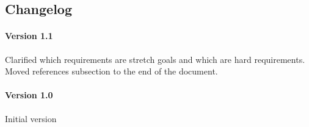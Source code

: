 \subsection{ Changelog }

\paragraph*{Version 1.1} Clarified which requirements are stretch goals and which are hard requirements. Moved references subsection to the end of the document.
\paragraph*{Version 1.0} Initial version
